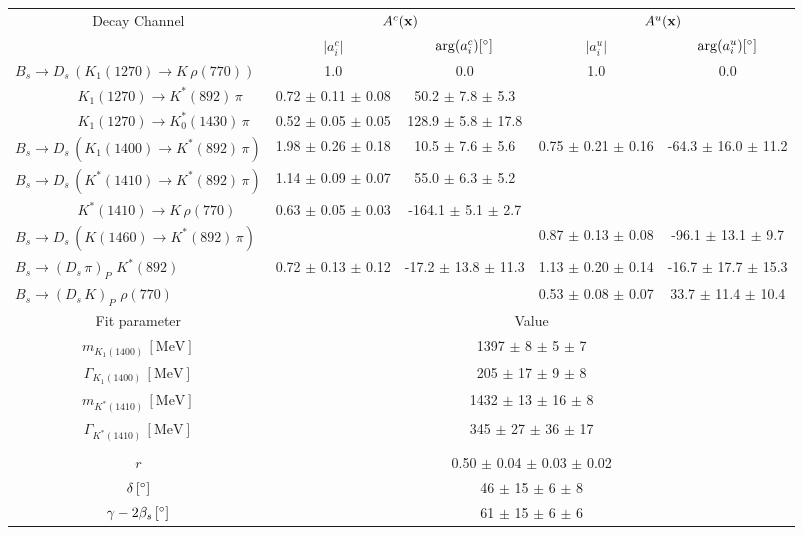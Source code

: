 \begin{tabular}{l c c c c } 
\toprule
\multicolumn{1}{c}{Decay Channel} & \multicolumn{2}{c}{$A^c(\mathbf{x})$} & \multicolumn{2}{c}{$A^u(\mathbf{x})$}  \\ 
 & \multicolumn{1}{c}{$\vert a^c_i \vert$}  & \multicolumn{1}{c}{$\arg(a^c_i) [^{\circ}]$}  & \multicolumn{1}{c}{$\vert a^u_i \vert$} & \multicolumn{1}{c}{$\arg(a^u_i) [^{\circ}]$} \\ 
\hline
 $B_s \to D_s \, ( K_1(1270) \to K \, \rho(770) ) $ &  1.0 & 0.0 & 1.0 & 0.0  \\ 
$\phantom{B_s \to D_s \, (} K_1(1270) \to K^{*}(892) \, \pi \phantom{)} $ & 0.72 $\pm$ 0.11 $\pm$ 0.08 & 50.2 $\pm$ 7.8 $\pm$ 5.3 & &   \\ 
$\phantom{B_s \to D_s \, (} K_1(1270) \to K^{*}_{0}(1430) \, \pi \phantom{)} $ & 0.52 $\pm$ 0.05 $\pm$ 0.05 & 128.9 $\pm$ 5.8 $\pm$ 17.8 & &   \\ 
$B_s \to D_s \, ( K_1(1400) \to K^{*}(892) \, \pi ) $ & 1.98 $\pm$ 0.26 $\pm$ 0.18 & 10.5 $\pm$ 7.6 $\pm$ 5.6 & 0.75 $\pm$ 0.21 $\pm$ 0.16 & -64.3 $\pm$ 16.0 $\pm$ 11.2 \\ 
$B_s \to D_s \, ( K^{*}(1410) \to K^{*}(892) \, \pi ) $ & 1.14 $\pm$ 0.09 $\pm$ 0.07 & 55.0 $\pm$ 6.3 $\pm$ 5.2 &  &  \\ 
$\phantom{B_s \to D_s \, (} K^{*}(1410) \to K \, \rho(770) \phantom{)} $ & 0.63 $\pm$ 0.05 $\pm$ 0.03 & -164.1 $\pm$ 5.1 $\pm$ 2.7 & &   \\ 
$B_s \to D_s \, ( K(1460) \to K^{*}(892) \, \pi ) $ & & &0.87 $\pm$ 0.13 $\pm$ 0.08 & -96.1 $\pm$ 13.1 $\pm$ 9.7 \\ 
$B_s \to ( D_s \, \pi)_{P} \, \, K^{*}(892) $ & 0.72 $\pm$ 0.13 $\pm$ 0.12 & -17.2 $\pm$ 13.8 $\pm$ 11.3 & 1.13 $\pm$ 0.20 $\pm$ 0.14 & -16.7 $\pm$ 17.7 $\pm$ 15.3 \\ 
$B_s \to ( D_s \, K)_{P} \, \, \rho(770) $ & & &0.53 $\pm$ 0.08 $\pm$ 0.07 & 33.7 $\pm$ 11.4 $\pm$ 10.4 \\ 
\hline
\hline
\multicolumn{1}{c}{Fit parameter} & \multicolumn{4}{c}{Value}  \\ 
\hline
\multicolumn{1}{c}{$m_{K_1(1400)} \, [\text{MeV}]$} & \multicolumn{4}{c}{1397 $\pm$ 8 $\pm$ 5 $\pm$ 7} \\ 
\multicolumn{1}{c}{$\Gamma_{K_1(1400)} \, [\text{MeV}]$} & \multicolumn{4}{c}{205 $\pm$ 17 $\pm$ 9 $\pm$ 8} \\ 
\multicolumn{1}{c}{$m_{K^{*}(1410)} \, [\text{MeV}]$} & \multicolumn{4}{c}{1432 $\pm$ 13 $\pm$ 16 $\pm$ 8} \\ 
\multicolumn{1}{c}{$\Gamma_{K^{*}(1410)} \, [\text{MeV}]$} & \multicolumn{4}{c}{345 $\pm$ 27 $\pm$ 36 $\pm$ 17} \\ 
 \\ 
\multicolumn{1}{c}{$r$} & \multicolumn{4}{c}{0.50 $\pm$ 0.04 $\pm$ 0.03 $\pm$ 0.02} \\ 
\multicolumn{1}{c}{$\delta \, [^{\circ}]$} & \multicolumn{4}{c}{46 $\pm$ 15 $\pm$ 6 $\pm$ 8} \\ 
\multicolumn{1}{c}{$\gamma - 2 \beta_{s} \, [^{\circ}]$} & \multicolumn{4}{c}{61 $\pm$ 15 $\pm$ 6 $\pm$ 6} \\ 
\bottomrule
\end{tabular}

